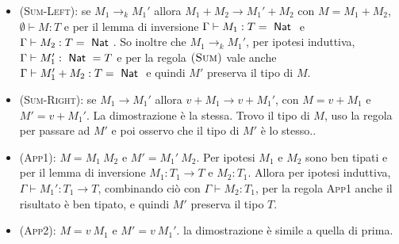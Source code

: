 \begin{itemize}
	\item \textsc{(Sum-Left)}: se $M_1 \rightarrow_k M_1'$ allora $M_1 + M_2 \rightarrow M_1' + M_2$ con $M = M_1 + M_2$, $\emptyset \vdash M :T $ e per il lemma di inversione $\Gamma \vdash M_1 : T = \Nat$ e $\Gamma \vdash M_2 : T = \Nat$. So inoltre che $M_1 \rightarrow_k M_1'$, per ipotesi induttiva, $\Gamma \vdash M_1' : \Nat = T$ e per la regola $\textsc{(Sum)}$ vale anche $\Gamma \vdash M_1' + M_2 : T = \Nat$ e quindi $M'$ preserva il tipo di $M$.
	\item \textsc{(Sum-Right)}: se $M_1 \rightarrow M_1'$ allora $v + M_1 \rightarrow v + M_1'$, con $M = v + M_1$ e $M' = v + M_1'$. La dimostrazione è la stessa. Trovo il tipo di $M$, uso la regola per passare ad $M'$ e poi osservo che il tipo di $M'$ è lo stesso..
	\item \textsc{(App1)}: $M = M_1 \: M_2$ e $M' = M_1' \: M_2$. Per ipotesi $M_1$ e $M_2$ sono ben tipati e per il lemma di inversione $M_1 : T_1 \rightarrow T$ e $M_2 : T_1$. Allora per ipotesi induttiva, $\Gamma \vdash M_1' : T_1 \rightarrow T$, combinando ciò con $\Gamma \vdash M_2 : T_1$, per la regola \textsc{App1} anche il risultato è ben tipato, e quindi $M'$ preserva il tipo $T$.
	\item \textsc{(App2)}: $M = v \: M_1$ e $M' = v \: M_1'$. la dimostrazione è simile a quella di prima.
\end{itemize}





